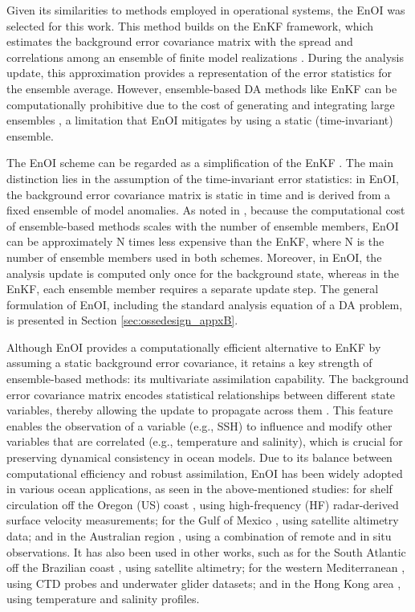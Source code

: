Given its similarities to methods employed in operational systems, the EnOI was selected for this work. This method builds on the EnKF framework, which estimates the background error covariance matrix with the spread and correlations among an ensemble of finite model realizations \parencite{evensen1994sequential}. During the analysis update, this approximation provides a representation of the error statistics for the ensemble average. However, ensemble-based DA methods like EnKF can be computationally prohibitive due to the cost of generating and integrating large ensembles \parencite{oke2010ocean}, a limitation that EnOI mitigates by using a static (time-invariant) ensemble.

The EnOI scheme can be regarded as a simplification of the EnKF \parencite{evensen2003ensemble, oke2002assimilaiton}. The main distinction lies in the assumption of the time-invariant error statistics: in EnOI, the background error covariance matrix is static in time and is derived from a fixed ensemble of model anomalies. As noted in \parencite{oke2010ocean}, because the computational cost of ensemble-based methods scales with the number of ensemble members, EnOI can be approximately N times less expensive than the EnKF, where N is the number of ensemble members used in both schemes. Moreover, in EnOI, the analysis update is computed only once for the background state, whereas in the EnKF, each ensemble member requires a separate update step. The general formulation of EnOI, including the standard analysis equation of a DA problem, is presented in Section \ref{sec:ossedesign_appxB}.

Although EnOI provides a computationally efficient alternative to EnKF by assuming a static background error covariance, it retains a key strength of ensemble-based methods: its multivariate assimilation capability. The background error covariance matrix encodes statistical relationships between different state variables, thereby allowing the update to propagate across them \parencite{counillon2009ensemble}. This feature enables the observation of a variable (e.g., SSH) to influence and modify other variables that are correlated (e.g., temperature and salinity), which is crucial for preserving dynamical consistency in ocean models. Due to its balance between computational efficiency and robust assimilation, EnOI has been widely adopted in various ocean applications, as seen in the above-mentioned studies: for shelf circulation off the Oregon (US) coast \parencite{oke2002assimilaiton}, using high-frequency (HF) radar-derived surface velocity measurements; for the Gulf of Mexico \parencite{counillon2009ensemble}, using satellite altimetry data; and in the Australian region \parencite{oke2010ocean}, using a combination of remote and in situ observations. It has also been used in other works, such as for the South Atlantic off the Brazilian coast \parencite{tanajura2013assimilation}, using satellite altimetry; for the western Mediterranean \parencite{lasheras2018dense}, using CTD probes and underwater glider datasets; and in the Hong Kong area \parencite{liu2021assimilation}, using temperature and salinity profiles.

